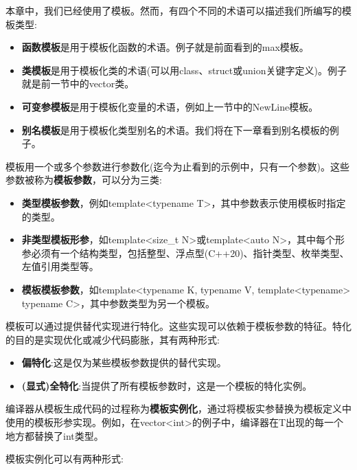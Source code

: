 本章中，我们已经使用了模板。然而，有四个不同的术语可以描述我们所编写的模板类型:

\begin{itemize}
\item
\textbf{函数模板}是用于模板化函数的术语。例子就是前面看到的max模板。

\item
\textbf{类模板}是用于模板化类的术语(可以用class、struct或union关键字定义)。例子就是前一节中的vector类。

\item
\textbf{可变参模板}是用于模板化变量的术语，例如上一节中的NewLine模板。

\item
\textbf{别名模板}是用于模板化类型别名的术语。我们将在下一章看到别名模板的例子。
\end{itemize}

模板用一个或多个参数进行参数化(迄今为止看到的示例中，只有一个参数)。这些参数被称为\textbf{模板参数}，可以分为三类:

\begin{itemize}
\item
\textbf{类型模板参数}，例如template<typename T>，其中参数表示使用模板时指定的类型。

\item
\textbf{非类型模板形参}，如template<size\_t N>或template<auto N>，其中每个形参必须有一个结构类型，包括整型、浮点型(C++20)、指针类型、枚举类型、左值引用类型等。

\item
\textbf{模板模板参数}，如template<typename K, typename V, template<typename> typename C>，其中参数类型为另一个模板。
\end{itemize}

模板可以通过提供替代实现进行特化。这些实现可以依赖于模板参数的特征。特化的目的是实现优化或减少代码膨胀，其有两种形式:

\begin{itemize}
\item
\textbf{偏特化}:这是仅为某些模板参数提供的替代实现。

\item
\textbf{(显式)全特化}:当提供了所有模板参数时，这是一个模板的特化实例。
\end{itemize}

编译器从模板生成代码的过程称为\textbf{模板实例化}，通过将模板实参替换为模板定义中使用的模板形参实现。例如，在vector<int>的例子中，编译器在T出现的每一个地方都替换了int类型。

模板实例化可以有两种形式:

